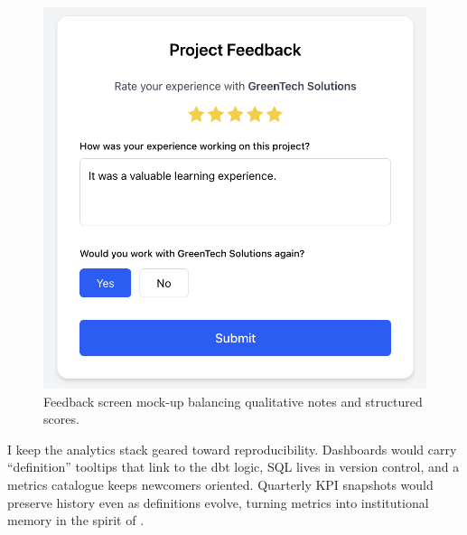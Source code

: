 \begin{figure}[H]
  \centering
  \includegraphics[width=0.8\linewidth]{figures/Student-Project-Feedback.png}
  \caption{Feedback screen mock-up balancing qualitative notes and structured scores.}
  \label{fig:feedback-screen}
\end{figure}

I keep the analytics stack geared toward reproducibility. Dashboards would carry ``definition'' tooltips that link to the dbt logic, SQL lives in version control, and a metrics catalogue keeps newcomers oriented. Quarterly KPI snapshots would preserve history even as definitions evolve, turning metrics into institutional memory in the spirit of \citet{Choudary2016}.
